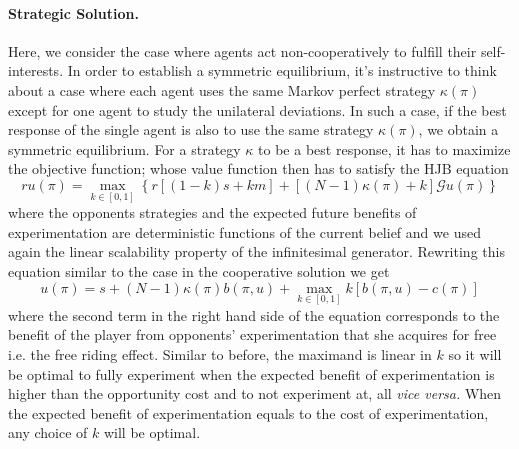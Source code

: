 \paragraph{Strategic Solution.} Here, we consider the case where agents act non-cooperatively to fulfill their self-interests. In order to establish a symmetric equilibrium, it's instructive to think about a case where each agent uses the same Markov perfect strategy $\kappa(\pi)$ except for one agent to study the unilateral deviations. In such a case, if the best response of the single agent is also to use the same strategy $\kappa(\pi)$, we obtain a symmetric equilibrium. For a strategy $\kappa$ to be a best response, it has to maximize the objective function;
whose value function then has to satisfy the HJB equation
\[ ru(\pi) = \max_{k \in [0,1]} \left\{r\left[ \left( 1- k \right)s + k m \right] + [(N-1)\kappa (\pi) + k] \mathcal{G} u(\pi) \right\}\]
where the opponents strategies and the expected future benefits of experimentation are deterministic functions of the current belief and we used again the linear scalability property of the infinitesimal generator. Rewriting this equation similar to the case in the cooperative solution we get
\[u(\pi) = s + (N-1)\kappa(\pi)b(\pi,u) + \max_{k \in [0,1]} k \left[b(\pi, u) - c(\pi)\right]\]
where the second term in the right hand side of the equation corresponds to the benefit of the player from opponents' experimentation that she acquires for free i.e. the free riding effect. Similar to before, the maximand is linear in $k$ so it will be optimal to fully experiment when the expected benefit of experimentation is higher than the opportunity cost and to not experiment at, all \textit{vice versa.} When the expected benefit of experimentation equals to the cost of experimentation, any choice of $k$ will be optimal.

